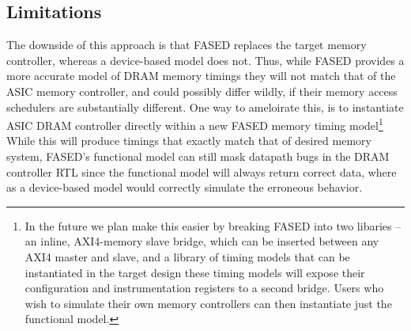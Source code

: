 \subsection{Limitations}
The downside of this approach is that FASED replaces the target memory
controller, whereas a device-based model does not. Thus, while FASED provides a
more accurate model of DRAM memory timings they will not match that of the ASIC
memory controller, and could possibly differ wildly, if their memory access
schedulers are substantially different. One way to ameloirate this, is to
instantiate ASIC DRAM controller directly within a new FASED memory timing
model\footnote{In the future we plan make this easier by breaking FASED into
two libaries -- an inline, AXI4-memory slave bridge, which can be inserted
between any AXI4 master and slave, and a library of timing models that can be
instantiated in the target design these timing models will expose their
configuration and instrumentation registers to a second bridge. Users who wish
to simulate their own memory controllers can then instantiate just the
functional model.} While this will produce timings that exactly match that of
desired memory system, FASED's functional model can still mask datapath bugs in
the DRAM controller RTL since the functional model will always return correct
data, where as a device-based model would correctly simulate the erroneous
behavior.

